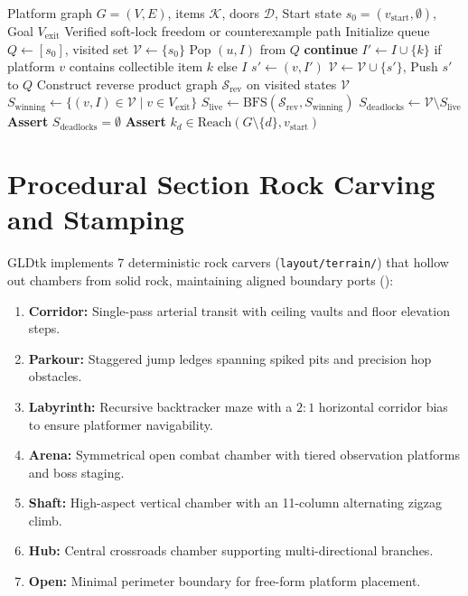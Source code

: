 \documentclass[11pt,a4paper]{report}
\theoremstyle{definition}
\theoremstyle{remark}
\begin{document}
\begin{algorithm}[H]
\caption{Inventory-State Product Automaton Model Checking}
\label{alg:product_automaton}
\begin{algorithmic}[1]
\Require Platform graph $G=(V, E)$, items $\mathcal{K}$, doors $\mathcal{D}$, Start state $s_0 = (v_{\text{start}}, \emptyset)$, Goal $V_{\text{exit}}$
\Ensure Verified soft-lock freedom or counterexample path
\State Initialize queue $Q \gets [s_0]$, visited set $\mathcal{V} \gets \{s_0\}$
    \State Pop $(u, I)$ from $Q$
            \State \textbf{continue} 
        \EndIf
        \State $I' \gets I \cup \{k\}$ if platform $v$ contains collectible item $k$ else $I$
        \State $s' \gets (v, I')$
            \State $\mathcal{V} \gets \mathcal{V} \cup \{s'\}$, Push $s'$ to $Q$
        \EndIf
    \EndFor
\EndWhile
\State Construct reverse product graph $\mathcal{S}_{\text{rev}}$ on visited states $\mathcal{V}$
\State $S_{\text{winning}} \gets \{(v, I) \in \mathcal{V} \mid v \in V_{\text{exit}}\}$
\State $S_{\text{live}} \gets \text{BFS}(\mathcal{S}_{\text{rev}}, S_{\text{winning}})$
\State $S_{\text{deadlocks}} \gets \mathcal{V} \setminus S_{\text{live}}$
\State \textbf{Assert} $S_{\text{deadlocks}} = \emptyset$
 
    \State \textbf{Assert} $k_d \in \text{Reach}(G \setminus \{d\}, v_{\text{start}})$
\EndFor
\end{algorithmic}
\end{algorithm}

\section{Procedural Section Rock Carving and Stamping}
\label{sec:carvers}
GLDtk implements 7 deterministic rock carvers (\texttt{layout/terrain/}) that hollow out chambers from solid rock, maintaining aligned boundary ports ():
\begin{enumerate}
    \item \textbf{Corridor:} Single-pass arterial transit with ceiling vaults and floor elevation steps.
    \item \textbf{Parkour:} Staggered jump ledges spanning spiked pits and precision hop obstacles.
    \item \textbf{Labyrinth:} Recursive backtracker maze with a $2:1$ horizontal corridor bias to ensure platformer navigability.
    \item \textbf{Arena:} Symmetrical open combat chamber with tiered observation platforms and boss staging.
    \item \textbf{Shaft:} High-aspect vertical chamber with an 11-column alternating zigzag climb.
    \item \textbf{Hub:} Central crossroads chamber supporting multi-directional branches.
    \item \textbf{Open:} Minimal perimeter boundary for free-form platform placement.
\end{enumerate}
\end{document}

